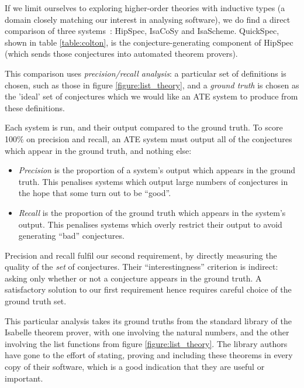 
If we limit ourselves to exploring higher-order theories with inductive types
(a domain closely matching our interest in analysing software), we do find a
direct comparison of three systems~\cite{claessen2013automating}: HipSpec,
IsaCoSy and IsaScheme. QuickSpec, shown in table \ref{table:colton}, is the
conjecture-generating component of HipSpec (which sends those conjectures into
automated theorem provers).

This comparison uses \emph{precision/recall analysis}: a particular set of
definitions is chosen, such as those in figure \ref{figure:list_theory}, and a
\emph{ground truth} is chosen as the 'ideal' set of conjectures which we would
like an ATE system to produce from these definitions.

Each system is run, and their output compared to the ground truth. To score
100\% on precision and recall, an ATE system must output all of the conjectures
which appear in the ground truth, and nothing else:

\begin{itemize}
\item \emph{Precision} is the proportion of a system's output which appears in
  the ground truth. This penalises systems which output large numbers of
  conjectures in the hope that some turn out to be ``good''.
\item \emph{Recall} is the proportion of the ground truth which appears in the
  system's output. This penalises systems which overly restrict their output to
  avoid generating ``bad'' conjectures.
\end{itemize}

Precision and recall fulfil our second requirement, by directly measuring the
quality of the \emph{set} of conjectures. Their ``interestingness'' criterion is
indirect: asking only whether or not a conjecture appears in the ground truth.
A satisfactory solution to our first requirement hence requires careful choice
of the ground truth set.

This particular analysis takes its ground truths from the standard library of
the Isabelle theorem prover, with one involving the natural numbers, and the
other involving the list functions from figure \ref{figure:list_theory}. The
library authors have gone to the effort of stating, proving and including these
theorems in every copy of their software, which is a good indication that they
are useful or important.

